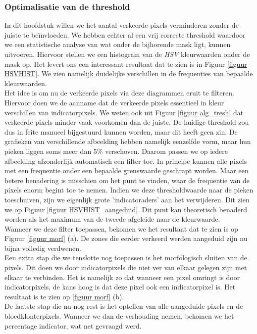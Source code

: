 \documentclass[a4paper,kulak]{kulakarticle}
\begin{document}
\subsubsection{Optimalisatie van de threshold} \label{additional_filter}
In dit hoofdstuk willen we het aantal verkeerde pixels verminderen zonder de juiste te beïnvloeden. We hebben echter al een vrij correcte threshold waardoor we een statistische analyse van wat onder de bijhorende mask ligt, kunnen uitvoeren. Hiervoor stellen we een histogram van de \textit{HSV} kleurwaarden onder de mask op. Het levert ons een interessant resultaat dat te zien is in Figuur  \ref{figuur HSVHIST}. We zien namelijk duidelijke verschillen in de frequenties van bepaalde kleurwaarden.\\
Het idee is om nu de verkeerde pixels via deze diagrammen eruit te filteren. Hiervoor doen we de aanname dat de verkeerde pixels essentieel in kleur verschillen van indicatorpixels. We weten ook uit Figuur \ref{figuur alg_tresh} dat verkeerde pixels minder vaak voorkomen dan de juiste. De huidige threshold zou dus in feite manueel bijgestuurd kunnen worden, maar dit heeft geen zin. De grafieken van verschillende afbeelding hebben namelijk eenzelfde vorm, maar hun pieken liggen soms meer dan 5\% verschoven. Daarom passen we op iedere afbeelding afzonderlijk automatisch een filter toe. In principe kunnen alle pixels met een frequentie onder een bepaalde grenswaarde geschrapt worden. Maar een betere benadering is misschien om het punt te vinden, waar de frequentie van de pixels enorm begint toe te nemen. Indien we deze thresholdwaarde naar de pieken toeschuiven, zijn we eigenlijk grote 'indicatoraders' aan het verwijderen. Dit zien we op Figuur \ref{figuur HSVHIST_aangeduid}. Dit punt kan theoretisch benaderd worden als het maximum van de tweede afgeleide naar de kleurwaarde. \\
Wanneer we deze filter toepassen, bekomen we het resultaat dat te zien is op Figuur \ref{figuur morf} (a). De zones die eerder verkeerd werden aangeduid zijn nu bijna volledig verdwenen.\\
Een extra stap die we tenslotte nog toepassen is het morfologisch sluiten van de pixels. Dit doen we door indicatorpixels die niet ver van elkaar gelegen zijn met elkaar te verbinden. Het is namelijk zo dat wanneer een pixel omringt is door indicatorpixels, de kans hoog is dat deze pixel ook een indicatorpixel is. Het resultaat is te zien op \ref{figuur morf} (b).\\
De laatste stap die nu nog rest is het optellen van alle aangeduide pixels en de bloedklonterpixels. Wanneer we dan de verhouding nemen, bekomen we het percentage indicator, wat net gevraagd werd.
\end{document}
